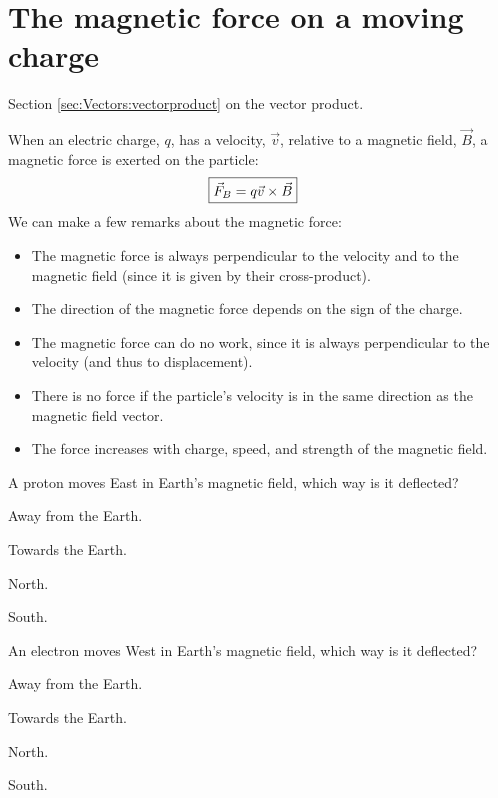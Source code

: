 \section{The magnetic force on a moving charge}
\begin{review}
	\item Section \ref{sec:Vectors:vectorproduct} on the vector product.
\end{review}
When an electric charge, $q$, has a velocity, $\vec v$, relative to a magnetic field, $\vec B$, a magnetic force is exerted on the particle:
\begin{align*}
\Aboxed{\vec F_B = q \vec v \times \vec B}
\end{align*}
We can make a few remarks about the magnetic force:
\begin{itemize}
\item The magnetic force is always perpendicular to the velocity and to the magnetic field (since it is given by their cross-product).
\item The direction of the magnetic force depends on the sign of the charge.
\item The magnetic force can do no work, since it is always perpendicular to the velocity (and thus to displacement).
\item There is no force if the particle's velocity is in the same direction as the magnetic field vector. 
\item The force increases with charge, speed, and strength of the magnetic field.
\end{itemize}
\begin{checkpoint}{}
	\begin{MCquestion}{A proton moves East in Earth's magnetic field, which way is it deflected?}
		\item Away from the Earth. \correct
		\item Towards the Earth. 
		\item North.
		\item South.
	\end{MCquestion}
\end{checkpoint}
\begin{checkpoint}{}
	\begin{MCquestion}{An electron moves West in Earth's magnetic field, which way is it deflected?}
		\item Away from the Earth. \correct
		\item Towards the Earth. 
		\item North.
		\item South.
	\end{MCquestion}
\end{checkpoint}
